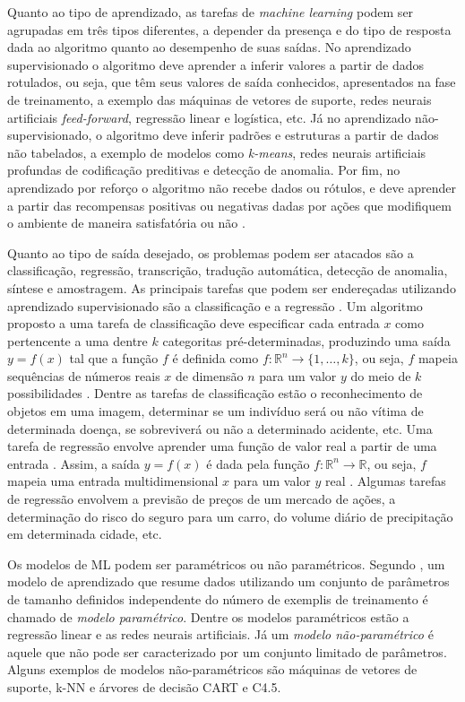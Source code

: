 Quanto ao tipo de aprendizado, as tarefas de \emph{machine learning} podem ser agrupadas em três tipos diferentes, a depender da presença e do tipo de resposta dada ao algoritmo quanto ao desempenho de suas saídas. No aprendizado supervisionado o algoritmo deve aprender a inferir valores a partir de dados rotulados, ou seja, que têm seus valores de saída conhecidos, apresentados na fase de treinamento, a exemplo das máquinas de vetores de suporte, redes neurais artificiais \emph{feed-forward}, regressão linear e logística, etc. Já no aprendizado não-supervisionado, o algoritmo deve inferir padrões e estruturas a partir de dados não tabelados, a exemplo de modelos como \emph{k-means}, redes neurais artificiais profundas de codificação preditivas e detecção de anomalia. Por fim, no aprendizado por reforço o algoritmo não recebe dados ou rótulos, e deve aprender a partir das recompensas positivas ou negativas dadas por ações que modifiquem o ambiente de maneira satisfatória ou não \cite{flach2012machine}.

Quanto ao tipo de saída desejado, os problemas podem ser atacados são a classificação, regressão, transcrição, tradução automática, detecção de anomalia, síntese e amostragem. As principais tarefas que podem ser endereçadas utilizando aprendizado supervisionado são a classificação e a regressão \cite{flach2012machine}. Um algoritmo proposto a uma tarefa de classificação deve especificar cada entrada $x$ como pertencente a uma dentre $k$ categoritas pré-determinadas, produzindo uma saída $y=f(x)$ tal que a função $f$ é definida como $f: \mathds{R}^n \rightarrow \{1, \ldots, k\}$, ou seja, $f$ mapeia sequências de números reais  $x$ de dimensão $n$ para um valor $y$ do meio de $k$ possibilidades \cite{goodfellow2016deep}. Dentre as tarefas de classificação estão o reconhecimento de objetos em uma imagem, determinar se um indivíduo será ou não vítima de determinada doença, se sobreviverá ou não a determinado acidente, etc. Uma tarefa de regressão envolve aprender uma função de valor real a partir de uma entrada \cite{flach2012machine}. Assim, a saída $y=f(x)$ é dada pela função $f: \mathds{R}^n \rightarrow \mathds{R}$, ou seja, $f$ mapeia uma entrada multidimensional $x$ para um valor $y$ real  \cite{goodfellow2016deep}. Algumas tarefas de regressão envolvem a previsão de preços de um mercado de ações, a determinação do risco do seguro para um carro, do volume diário de precipitação em determinada cidade, etc.

Os modelos de ML podem ser paramétricos ou não paramétricos. Segundo \cite{russell2016artificial}, um modelo de aprendizado que resume dados utilizando um conjunto de parâmetros de tamanho definidos independente do número de exemplis de treinamento é chamado de \emph{modelo paramétrico}. Dentre os modelos paramétricos estão a regressão linear e as redes neurais artificiais. Já um \emph{modelo não-paramétrico} é aquele que não pode ser caracterizado por um conjunto limitado de parâmetros. Alguns exemplos de modelos não-paramétricos são máquinas de vetores de suporte, k-NN e árvores de decisão CART e C4.5.


